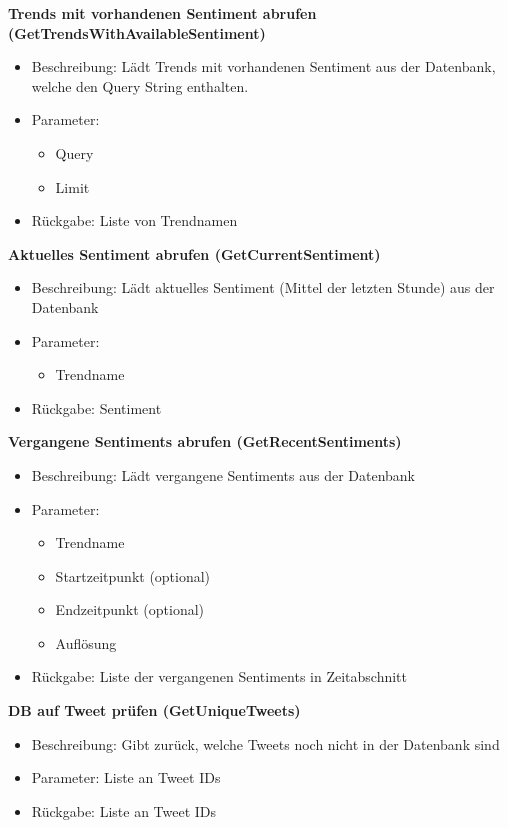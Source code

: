 \documentclass[conference]{IEEEtran}
\begin{document}
\textbf{Trends mit vorhandenen Sentiment abrufen (GetTrendsWithAvailableSentiment)}
\begin{itemize}
    \item Beschreibung: Lädt Trends mit vorhandenen Sentiment aus der Datenbank, welche den Query String enthalten.
    \item Parameter:
          \begin{itemize}
              \item Query
              \item Limit
          \end{itemize}
    \item Rückgabe: Liste von Trendnamen
\end{itemize}

\smallskip
\textbf{Aktuelles Sentiment abrufen (GetCurrentSentiment)}
\begin{itemize}
    \item Beschreibung: Lädt aktuelles Sentiment (Mittel der letzten Stunde) aus der Datenbank
    \item Parameter:
          \begin{itemize}
              \item Trendname
          \end{itemize}
    \item Rückgabe: Sentiment
\end{itemize}

\smallskip
\textbf{Vergangene Sentiments abrufen (GetRecentSentiments)}
\begin{itemize}
    \item Beschreibung: Lädt vergangene Sentiments aus der Datenbank
    \item Parameter:
          \begin{itemize}
              \item Trendname
              \item Startzeitpunkt (optional)
              \item Endzeitpunkt (optional)
              \item Auflösung
          \end{itemize}
    \item Rückgabe: Liste der vergangenen Sentiments in Zeitabschnitt 
\end{itemize}

\smallskip
\textbf{DB auf Tweet prüfen (GetUniqueTweets)}
\begin{itemize}
    \item Beschreibung: Gibt zurück, welche Tweets noch nicht in der Datenbank sind
    \item Parameter: Liste an Tweet IDs
    \item Rückgabe: Liste an Tweet IDs
\end{itemize}
\end{document}
